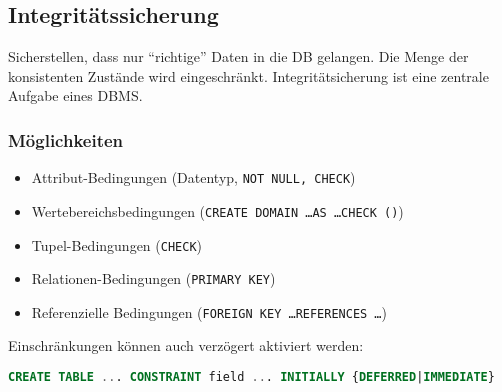 \subsection{Integritätssicherung}
Sicherstellen, dass nur \enquote{richtige} Daten in die DB gelangen. Die Menge der konsistenten Zustände wird eingeschränkt.
Integritätsicherung ist eine zentrale Aufgabe eines DBMS.

\subsubsection{Möglichkeiten}
\begin{itemize}
	\item Attribut-Bedingungen (Datentyp, \texttt{NOT NULL, CHECK})
	\item Wertebereichsbedingungen (\texttt{CREATE DOMAIN \dots AS \dots CHECK ()})
	\item Tupel-Bedingungen (\texttt{CHECK})
	\item Relationen-Bedingungen (\texttt{PRIMARY KEY})
	\item Referenzielle Bedingungen (\texttt{FOREIGN KEY \dots REFERENCES \dots})
\end{itemize}

Einschränkungen können auch verzögert aktiviert werden:
\begin{lstlisting}[language=SQL]
CREATE TABLE ... CONSTRAINT field ... INITIALLY {DEFERRED|IMMEDIATE}
\end{lstlisting}